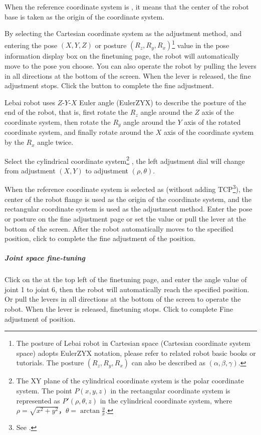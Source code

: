 When the reference coordinate system is , it means that the center of the robot base is taken as the origin of the coordinate system.

By selecting the Cartesian coordinate system as the adjustment method, and entering the pose $(X, Y, Z)$ or posture $(R_z, R_y, R_x)$\footnote{The posture of Lebai robot in Cartesian space (Cartesian coordinate system space) adopts EulerZYX notation, please refer to related robot basic books or tutorials. The posture $(R_z, R_y, R_x)$ can also be described as $(\alpha, \beta, \gamma)$.} value in the pose information display box on the fine­tuning page, the robot will automatically move to the pose you choose. You can also operate the robot by pulling the levers in all directions at the bottom of the screen. When the lever is released, the fine adjustment stops. Click the  button to complete the fine adjustment.

Lebai robot uses $Z\textrm{-}Y\textrm{-}X$ Euler angle (EulerZYX) to describe the posture of the end of the robot, that is, first rotate the $R_z$ angle around the $Z$ axis of the coordinate system, then rotate the $R_y$ angle around the $Y$ axis of the rotated coordinate system, and finally rotate around the $X$ axis of the coordinate system by the $R_x$ angle twice.

Select the cylindrical coordinate system\footnote{The X­Y plane of the cylindrical coordinate system is the polar coordinate system. The point $P(x, y, z)$ in the rectangular coordinate system is represented as $P'(\rho, \theta, z)$ in the cylindrical coordinate system, where $\rho=\sqrt{x^2+y^2}$，$\theta=\arctan\frac{y}{x}$.} , the left adjustment dial will change from adjustment $(X, Y)$ to adjustment $(\rho, \theta)$.

When the reference coordinate system is selected as  (without adding TCP\footnote{See .}), the center of the robot flange is used as the origin of the coordinate system, and the rectangular coordinate system is used as the adjustment method. Enter the pose or posture on the fine adjustment page or set the value or pull the lever at the bottom of the screen. After the robot automatically moves to the specified position, click  to complete the fine adjustment of the position.

\subparagraph{Joint space fine-tuning}
Click on the  at the top left of the fine­tuning page, and enter the angle value of joint 1 to joint 6, then the robot will automatically reach the specified position. Or pull the levers in all directions at the bottom of the screen to operate the robot. When the lever is released, fine­tuning stops. Click  to complete Fine adjustment of position.

